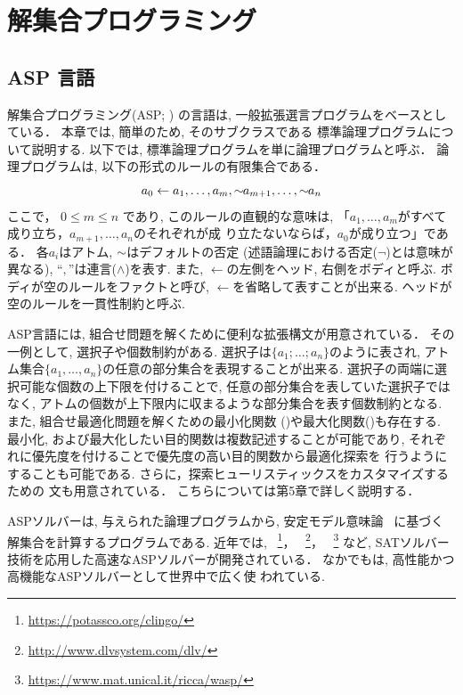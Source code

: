 \chapter{解集合プログラミング}\label{chap:asp}


\section{ASP 言語}
解集合プログラミング(ASP; 
\cite{%
  baral03:cambridge,%
  DBLP:conf/iclp/GelfondL88,%
  DBLP:journals/amai/Niemela99})
の言語は, 一般拡張選言プログラムをベースとしている．
本章では, 簡単のため, そのサブクラスである
標準論理プログラムについて説明する. 
以下では, 標準論理プログラムを単に論理プログラムと呼ぶ．
論理プログラムは, 以下の形式のルールの有限集合である．
\begin{displaymath}
  \label{eq:rule}
  a_0\leftarrow a_1,\dots,a_m,{\sim\!\!{a_{m+1}}},\dots,{\sim\!\!{a_n}}
\end{displaymath}
ここで，
$0\leq m\leq n$ であり, 
このルールの直観的な意味は, 
「$a_1,\ldots,a_m$がすべて成り立ち，$a_{m+1},\ldots,a_n$のそれぞれが成
り立たないならば，$a_0$が成り立つ」である．
各$a_i$はアトム, 
${\sim\!\!{}}$はデフォルトの否定 (述語論理における否定($\neg$)とは意味が異なる), 
``$,$''は連言($\land$)を表す. 
また, $\leftarrow$の左側をヘッド, 右側をボディと呼ぶ. 
ボディが空のルールをファクトと呼び, 
$\leftarrow$を省略して表すことが出来る. 
ヘッドが空のルールを一貫性制約と呼ぶ.

ASP言語には, 組合せ問題を解くために便利な拡張構文が用意されている．
その一例として, 選択子や個数制約がある. 
選択子は\(\{a_1;\dots;a_n\}\)のように表され, アトム集合\(\{a_1,\dots,a_n\}\)の任意の部分集合を表現することが出来る. 
選択子の両端に選択可能な個数の上下限を付けることで, 
任意の部分集合を表していた選択子ではなく, 
アトムの個数が上下限内に収まるような部分集合を表す個数制約となる. 
また, 組合せ最適化問題を解くための最小化関数
()や最大化関数()も存在する. 
最小化, および最大化したい目的関数は複数記述することが可能であり, 
それぞれに優先度を付けることで優先度の高い目的関数から最適化探索を
行うようにすることも可能である. 
さらに，探索ヒューリスティックスをカスタマイズするための 
文も用意されている．
こちらについては第5章で詳しく説明する．

ASPソルバーは, 与えられた論理プログラムから, 
安定モデル意味論~\cite{DBLP:conf/iclp/GelfondL88}
に基づく解集合を計算するプログラムである. 
近年では, 
{\clingo}~\footnote{\url{https://potassco.org/clingo/}}，
{\dlv}~\footnote{\url{http://www.dlvsystem.com/dlv/}}，
{\wasp}~\footnote{\url{https://www.mat.unical.it/ricca/wasp/}}
など, SATソルバー技術を応用した高速なASPソルバーが開発されている．
なかでも{\clingo}は, 高性能かつ高機能なASPソルバーとして世界中で広く使
われている. 

